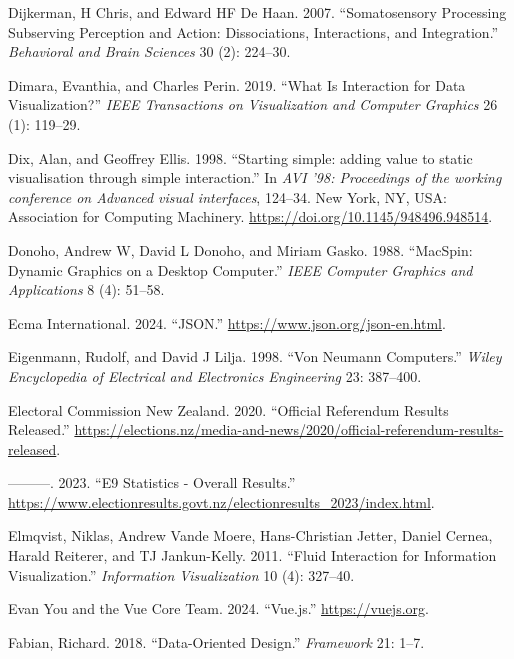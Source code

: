 \documentclass[
  openany]{book}
\newlength{\cslhangindent}
\newenvironment{CSLReferences}[2] %
 {\begin{list}{}{%
  \setlength{\itemindent}{0pt}
  \setlength{\leftmargin}{0pt}
  \setlength{\parsep}{0pt}
  \ifodd #1
   \setlength{\leftmargin}{\cslhangindent}
   \setlength{\itemindent}{-1\cslhangindent}
  \fi
  \setlength{\itemsep}{#2\baselineskip}}}
 {\end{list}}
\theoremstyle{definition}
\theoremstyle{definition}
\theoremstyle{definition}
\theoremstyle{definition}
\theoremstyle{remark}
\begin{document}
\begin{CSLReferences}{1}{0}
Dijkerman, H Chris, and Edward HF De Haan. 2007. {``Somatosensory Processing Subserving Perception and Action: Dissociations, Interactions, and Integration.''} \emph{Behavioral and Brain Sciences} 30 (2): 224--30.

Dimara, Evanthia, and Charles Perin. 2019. {``What Is Interaction for Data Visualization?''} \emph{IEEE Transactions on Visualization and Computer Graphics} 26 (1): 119--29.

Dix, Alan, and Geoffrey Ellis. 1998. {``{Starting simple: adding value to static visualisation through simple interaction}.''} In \emph{{AVI '98: Proceedings of the working conference on Advanced visual interfaces}}, 124--34. New York, NY, USA: Association for Computing Machinery. \url{https://doi.org/10.1145/948496.948514}.

Donoho, Andrew W, David L Donoho, and Miriam Gasko. 1988. {``MacSpin: Dynamic Graphics on a Desktop Computer.''} \emph{IEEE Computer Graphics and Applications} 8 (4): 51--58.

Ecma International. 2024. {``JSON.''} \url{https://www.json.org/json-en.html}.

Eigenmann, Rudolf, and David J Lilja. 1998. {``Von Neumann Computers.''} \emph{Wiley Encyclopedia of Electrical and Electronics Engineering} 23: 387--400.

Electoral Commission New Zealand. 2020. {``Official Referendum Results Released.''} \url{https://elections.nz/media-and-news/2020/official-referendum-results-released}.

---------. 2023. {``E9 Statistics - Overall Results.''} \url{https://www.electionresults.govt.nz/electionresults_2023/index.html}.

Elmqvist, Niklas, Andrew Vande Moere, Hans-Christian Jetter, Daniel Cernea, Harald Reiterer, and TJ Jankun-Kelly. 2011. {``Fluid Interaction for Information Visualization.''} \emph{Information Visualization} 10 (4): 327--40.

Evan You and the Vue Core Team. 2024. {``Vue.js.''} \url{https://vuejs.org}.

Fabian, Richard. 2018. {``Data-Oriented Design.''} \emph{Framework} 21: 1--7.


\end{CSLReferences}
\end{document}
